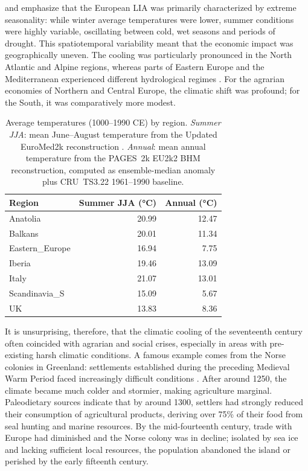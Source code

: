 \documentclass[11pt,a4paper]{article}
\begin{document}
\textcite{Wanner2022} and \textcite{Luterbacher2004} emphasize that the European LIA was primarily characterized by extreme seasonality: while winter average temperatures were lower, summer conditions were highly variable, oscillating between cold, wet seasons and periods of drought. This spatiotemporal variability meant that the economic impact was geographically uneven. The cooling was particularly pronounced in the North Atlantic and Alpine regions, whereas parts of Eastern Europe and the Mediterranean experienced different hydrological regimes \parencite{Hughes2014, Gaceu2025}. For the agrarian economies of Northern and Central Europe, the climatic shift was profound; for the South, it was comparatively more modest.

\begin{table}[h!]
  \centering
  \begin{tabular}{lrr}
    \toprule
    Region & Summer JJA (°C) & Annual (°C) \\
    \midrule
    Anatolia       & 20.99 & 12.47 \\
    Balkans        & 20.01 & 11.34 \\
    Eastern\_Europe & 16.94 &  7.75 \\
    Iberia         & 19.46 & 13.09 \\
    Italy          & 21.07 & 13.01 \\
    Scandinavia\_S  & 15.09 &  5.67 \\
    UK             & 13.83 &  8.36 \\
    \bottomrule
  \end{tabular}
  \caption{Average temperatures (1000--1990 CE) by region. \emph{Summer JJA}: mean June--August temperature from the Updated EuroMed2k reconstruction \parencite{Ljungqvist2019}. \emph{Annual}: mean annual temperature from the PAGES~2k EU2k2 BHM reconstruction, computed as ensemble-median anomaly plus CRU~TS3.22 1961--1990 baseline.}
  \label{tab:regional_temps}
\end{table}

It is unsurprising, therefore, that the climatic cooling of the seventeenth century often coincided with agrarian and social crises, especially in areas with pre-existing harsh climatic conditions. A famous example comes from the Norse colonies in Greenland: settlements established during the preceding Medieval Warm Period faced increasingly difficult conditions \parencite{dugmore_cultural_2012}. After around 1250, the climate became much colder and stormier, making agriculture marginal. Paleodietary sources indicate that by around 1300, settlers had strongly reduced their consumption of agricultural products, deriving over 75\% of their food from seal hunting and marine resources. By the mid-fourteenth century, trade with Europe had diminished and the Norse colony was in decline; isolated by sea ice and lacking sufficient local resources, the population abandoned the island or perished by the early fifteenth century.
\end{document}
